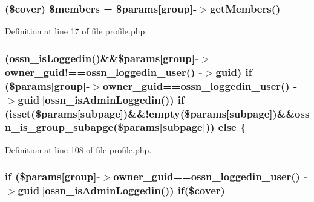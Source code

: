 \subsubsection[{\texorpdfstring{\$members}{$members}}]{ (\$cover) \$members = \$params\mbox{[}\textquotesingle{}group\textquotesingle{}\mbox{]}-\/$>$get\+Members()}\hypertarget{_ossn_groups_2plugins_2default_2groups_2pages_2profile_8php_a2f710c0f52109e082cc8cdc179d002d4}{}\label{_ossn_groups_2plugins_2default_2groups_2pages_2profile_8php_a2f710c0f52109e082cc8cdc179d002d4}


Definition at line 17 of file profile.\+php.

\subsubsection[{\texorpdfstring{else}{else}}]{ ({\bf ossn\+\_\+is\+Loggedin}()\&\&\$params\mbox{[}\textquotesingle{}group\textquotesingle{}\mbox{]}-\/$>$owner\+\_\+guid!=={\bf ossn\+\_\+loggedin\+\_\+user}() -\/$>$guid) {\bf if} (\$params\mbox{[}\textquotesingle{}group\textquotesingle{}\mbox{]}-\/$>${\bf owner\+\_\+guid}=={\bf ossn\+\_\+loggedin\+\_\+user}() -\/$>$guid$\vert$$\vert${\bf ossn\+\_\+is\+Admin\+Loggedin}()) {\bf if} (isset(\$params\mbox{[}\textquotesingle{}subpage\textquotesingle{}\mbox{]})\&\&!empty(\$params\mbox{[}\textquotesingle{}subpage\textquotesingle{}\mbox{]})\&\&{\bf ossn\+\_\+is\+\_\+group\+\_\+subapge}(\$params\mbox{[}\textquotesingle{}subpage\textquotesingle{}\mbox{]})) else \{}\hypertarget{_ossn_groups_2plugins_2default_2groups_2pages_2profile_8php_a49429671369637cdcf71e54d17118c0d}{}\label{_ossn_groups_2plugins_2default_2groups_2pages_2profile_8php_a49429671369637cdcf71e54d17118c0d}


Definition at line 108 of file profile.\+php.

\subsubsection[{\texorpdfstring{if}{if}}]{\setlength{\rightskip}{0pt plus 5cm}if (\$params\mbox{[}\textquotesingle{}group\textquotesingle{}\mbox{]}-\/$>${\bf owner\+\_\+guid}=={\bf ossn\+\_\+loggedin\+\_\+user}() -\/$>$guid$\vert$$\vert${\bf ossn\+\_\+is\+Admin\+Loggedin}()) if(\$cover)}\hypertarget{_ossn_groups_2plugins_2default_2groups_2pages_2profile_8php_a1973cb4de7b19378e96144c69f833e9a}{}\label{_ossn_groups_2plugins_2default_2groups_2pages_2profile_8php_a1973cb4de7b19378e96144c69f833e9a}


